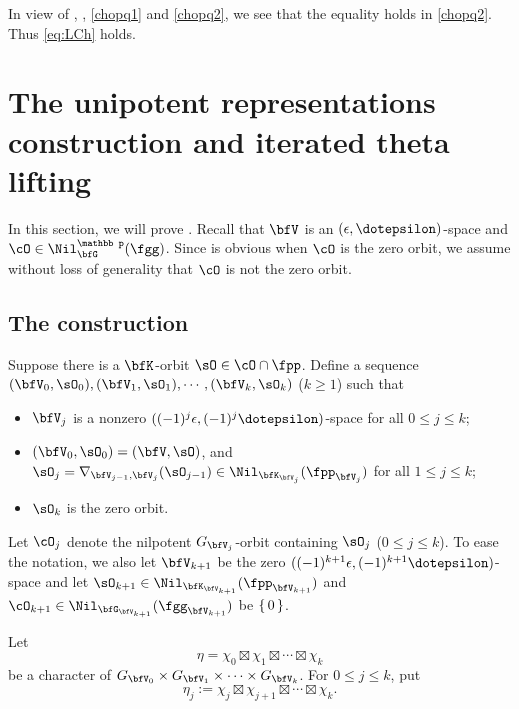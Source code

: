\documentclass[12pt,a4paper]{amsart}
\def\DD{\nabla}
\numberwithin{equation}{section}
\theoremstyle{remark}
\begin{document}
 In view of ,  , \eqref{chopq1} and \eqref{chopq2}, we see that the
 equality holds in \eqref{chopq2}. Thus \cref{eq:LCh} holds.




\section{The unipotent representations construction and iterated theta lifting}\label{sec:unipot}
In this section, we will prove . Recall that $\bfV$ is an
$(\epsilon,\dotepsilon)$-space and $\cO\in
\Nil^{\mathbb p}_{\bfG}(\fgg)$. Since   is obvious when $\cO$ is the zero orbit, we assume without loss of generality that $\cO$ is not the zero orbit.

\subsection{The construction}\label{sec:cons}
Suppose there is a $\bfK$-orbit $\sO\in \cO\cap \fpp$.
Define a sequence $(\bfV_0, \sO_0), (\bfV_1, \sO_1), \cdots,  (\bfV_k, \sO_k)$ ($k\geq 1$)  such
that
\begin{itemize}
\item
$\bfV_j$ is a nonzero $((-1)^j\epsilon,(-1)^j\dotepsilon)$-space for all $0\leq j\leq k$;
\item
$(\bfV_0, \sO_0)=(\bfV, \sO)$, and  $\sO_j =
\DD_{\bfV_{j-1}, \bfV_j}(\sO_{j-1})\in \Nil_{\bfK_{\bfV_j}}(\fpp_{\bfV_j})$ for all $1\leq j\leq k$;
\item
 $\sO_k$ is the zero orbit.
 \end{itemize}
 Let $\cO_j$ denote the nilpotent
 $G_{\bfV_j}$-orbit containing $\sO_j$ ($0\leq j\leq k$).
 To ease the notation, we also let
 $\bfV_{k+1}$ be the zero $((-1)^{k+1}\epsilon,(-1)^{k+1}\dotepsilon)$-space
 and let $\sO_{k+1}\in  \Nil_{\bfK_{\bfV_{k+1}}}(\fpp_{\bfV_{k+1}})$
 and $\cO_{k+1}\in \Nil_{\bfG_{\bfV_{k+1}}}(\fgg_{\bfV_{k+1}})$ be $\set{0}$.


Let
\begin{equation}\label{eq:eta}
\eta=\chi_0\boxtimes \chi_1\boxtimes \cdots \boxtimes \chi_k
\end{equation}
be a character of
$G_{\bfV_0}\times G_{\bfV_1}\times \cdots \times G_{\bfV_k}$.
For $0\leq j\leq k$, put
\[
\eta_j:= \chi_j\boxtimes \chi_{j+1}\boxtimes \cdots \boxtimes \chi_k.
\]
\end{document}
